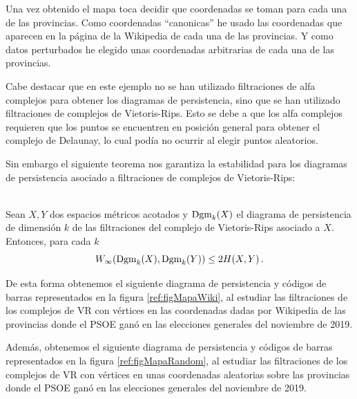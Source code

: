 Una vez obtenido el mapa toca decidir que coordenadas se toman para cada una de las provincias. Como coordenadas ``canonicas'' he usado las coordenadas que aparecen en la página de la Wikipedia de cada una de las provincias. Y como datos perturbados he elegido unas coordenadas arbitrarias de cada una de las provincias.

Cabe destacar que en este ejemplo no se han utilizado filtraciones de alfa complejos para obtener los diagramas de persistencia, sino que se han utilizado filtraciones de complejos de Vietoris-Rips. Esto se debe a que los alfa complejos requieren que los puntos se encuentren en posición general para obtener el complejo de Delaunay, lo cual podía no ocurrir al elegir puntos aleatorios.

Sin embargo el siguiente teorema nos garantiza la estabilidad para los diagramas de persistencia asociado a filtraciones de complejos de Vietoris-Rips:

\begin{theorem}
$ $\\
Sean $X, Y$ dos espacios métricos acotados y $\text{\rm Dgm}_k(X)$ el diagrama de persistencia de dimensión $k$ de las filtraciones del complejo de Vietoris-Rips asociado a $X$. Entonces, para cada $k$
\[
W_\infty(\text{\rm Dgm}_k(X), \text{\rm Dgm}_k(Y)) \leq 2H(X, Y)\,.
\]
\end{theorem}

De esta forma obtenemos el siguiente diagrama de persistencia y códigos de barras representados en la figura \ref{ref:figMapaWiki}, al estudiar las filtraciones de los complejos de VR con vértices en las coordenadas dadas por Wikipedia de las provincias donde el PSOE ganó en las elecciones generales del noviembre de 2019.

Además, obtenemos el siguiente diagrama de persistencia y códigos de barras representados en la figura \ref{ref:figMapaRandom}, al estudiar las filtraciones de los complejos de VR con vértices en unas coordenadas aleatorias sobre las provincias donde el PSOE ganó en las elecciones generales del noviembre de 2019.

